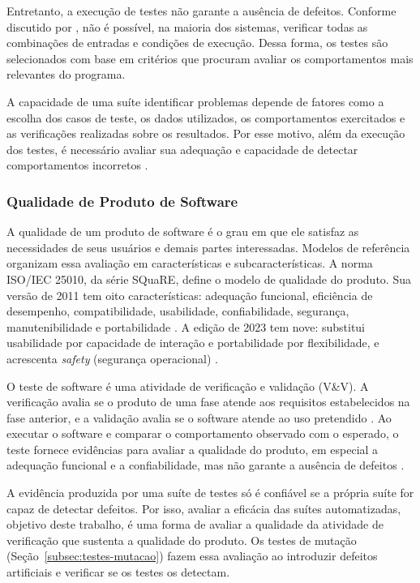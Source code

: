Entretanto, a execução de testes não garante a ausência de defeitos. Conforme discutido por , não é possível, na maioria dos sistemas, verificar todas as combinações de entradas e condições de execução. Dessa forma, os testes são selecionados com base em critérios que procuram avaliar os comportamentos mais relevantes do programa.

A capacidade de uma suíte identificar problemas depende de fatores como a escolha dos casos de teste, os dados utilizados, os comportamentos exercitados e as verificações realizadas sobre os resultados. Por esse motivo, além da execução dos testes, é necessário avaliar sua adequação e capacidade de detectar comportamentos incorretos \cite{ammann2016}.

\subsubsection{Qualidade de Produto de Software}

A qualidade de um produto de software é o grau em que ele satisfaz as necessidades de seus usuários e demais partes interessadas. Modelos de referência organizam essa avaliação em características e subcaracterísticas. A norma ISO/IEC 25010, da série SQuaRE, define o modelo de qualidade do produto. Sua versão de 2011 tem oito características: adequação funcional, eficiência de desempenho, compatibilidade, usabilidade, confiabilidade, segurança, manutenibilidade e portabilidade \cite{iso25010_2011}. A edição de 2023 tem nove: substitui usabilidade por capacidade de interação e portabilidade por flexibilidade, e acrescenta \textit{safety} (segurança operacional) \cite{iso25010_2023}.

O teste de software é uma atividade de verificação e validação (V\&V). A verificação avalia se o produto de uma fase atende aos requisitos estabelecidos na fase anterior, e a validação avalia se o software atende ao uso pretendido \cite{ammann2016}. Ao executar o software e comparar o comportamento observado com o esperado, o teste fornece evidências para avaliar a qualidade do produto, em especial a adequação funcional e a confiabilidade, mas não garante a ausência de defeitos \cite{ammann2016}.

A evidência produzida por uma suíte de testes só é confiável se a própria suíte for capaz de detectar defeitos. Por isso, avaliar a eficácia das suítes automatizadas, objetivo deste trabalho, é uma forma de avaliar a qualidade da atividade de verificação que sustenta a qualidade do produto. Os testes de mutação (Seção~\ref{subsec:testes-mutacao}) fazem essa avaliação ao introduzir defeitos artificiais e verificar se os testes os detectam.

